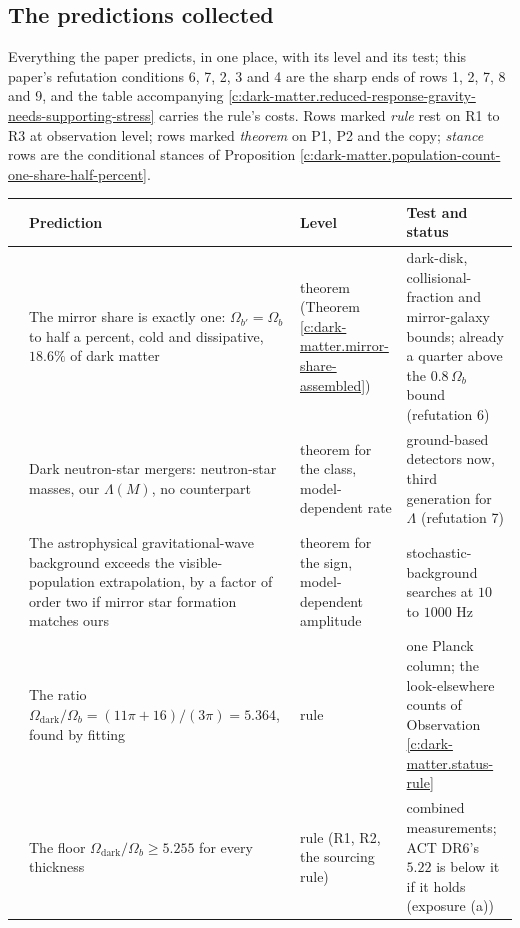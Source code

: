 \documentclass[11pt]{article}
\theoremstyle{definition}
\theoremstyle{plain}
\begin{document}
\subsection*{The predictions collected}
\label{c:note.dark-matter.setting-predictions-collected}
Everything the paper predicts, in one place, with its level and its test; this paper's refutation conditions 6, 7, 2, 3 and 4 are the sharp ends of rows 1, 2, 7, 8 and 9, and the table accompanying \ref{c:dark-matter.reduced-response-gravity-needs-supporting-stress} carries the rule's costs. Rows marked \emph{rule} rest on R1 to R3 at observation level; rows marked \emph{theorem} on P1, P2 and the copy; \emph{stance} rows are the conditional stances of Proposition \ref{c:dark-matter.population-count-one-share-half-percent}.

\begin{center} \begin{tabular}{>{ \arraybackslash}p{0.5cm}>{ \arraybackslash}p{5.2cm}>{ \arraybackslash}p{2.4cm}>{ \arraybackslash}p{5.6cm}}
\toprule
& Prediction & Level & Test and status \\
\midrule
1 & The mirror share is exactly one: $\Omega_{b'} = \Omega_{b}$ to half a percent, cold and dissipative, $18.6\%$ of dark matter & theorem (Theorem \ref{c:dark-matter.mirror-share-assembled}) & dark-disk, collisional-fraction and mirror-galaxy bounds; already a quarter above the $0.8\,\Omega_{b}$ bound (refutation 6) \\[2pt]
2 & Dark neutron-star mergers: neutron-star masses, our $\Lambda(M)$, no counterpart & theorem for the class, model-dependent rate & ground-based detectors now, third generation for $\Lambda$ (refutation 7) \\[2pt]
3 & The astrophysical gravitational-wave background exceeds the visible-population extrapolation, by a factor of order two if mirror star formation matches ours & theorem for the sign, model-dependent amplitude & stochastic-background searches at $10$ to $1000$ Hz \\[2pt]
4 & The ratio $\Omega_{\mathrm{dark}}/\Omega_{b} = (11\pi + 16)/(3\pi) = 5.364$, found by fitting & rule & one Planck column; the look-elsewhere counts of Observation \ref{c:dark-matter.status-rule} \\[2pt]
5 & The floor $\Omega_{\mathrm{dark}}/\Omega_{b} \geq 5.255$ for every thickness & rule (R1, R2, the sourcing rule) & combined measurements; ACT DR6's $5.22$ is below it if it holds (exposure (a)) \\[2pt]

\end{tabular}
\end{center}
\end{document}

